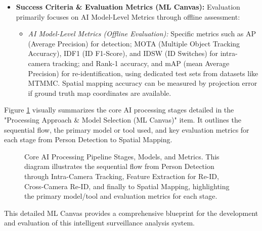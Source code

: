 \begin{itemize}
    \item \textbf{Success Criteria \& Evaluation Metrics (ML Canvas):}
        Evaluation primarily focuses on AI Model-Level Metrics through offline assessment:
        \begin{itemize}
            \item \textit{AI Model-Level Metrics (Offline Evaluation):} Specific metrics such as AP (Average Precision) for detection; MOTA (Multiple Object Tracking Accuracy), IDF1 (ID F1-Score), and IDSW (ID Switches) for intra-camera tracking; and Rank-1 accuracy, and mAP (mean Average Precision) for re-identification, using dedicated test sets from datasets like MTMMC. Spatial mapping accuracy can be measured by projection error if ground truth map coordinates are available.
        \end{itemize}
\end{itemize}

Figure \ref{fig:ml_pipeline_stages} visually summarizes the core AI processing stages detailed in the "Processing Approach \& Model Selection (ML Canvas)" item. It outlines the sequential flow, the primary model or tool used, and key evaluation metrics for each stage from Person Detection to Spatial Mapping.

\begin{figure}[!htb]
    \centering
    \caption{Core AI Processing Pipeline Stages, Models, and Metrics. This diagram illustrates the sequential flow from Person Detection through Intra-Camera Tracking, Feature Extraction for Re-ID, Cross-Camera Re-ID, and finally to Spatial Mapping, highlighting the primary model/tool and evaluation metrics for each stage.}

    \label{fig:ml_pipeline_stages}

\end{figure}
\clearpage

This detailed ML Canvas provides a comprehensive blueprint for the development and evaluation of this intelligent surveillance analysis system.

